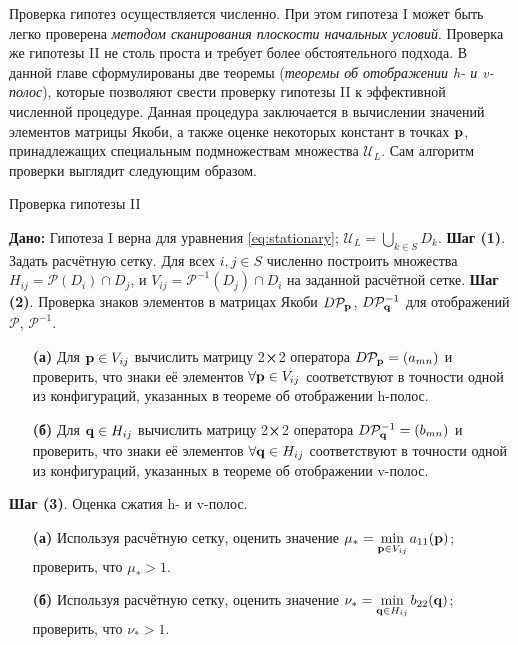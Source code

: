 \documentclass[candidate, href, colorlinks]{disser}
\begin{document}
Проверка гипотез осуществляется численно.
При этом гипотеза I может быть легко проверена {\it методом сканирования плоскости начальных условий}.
Проверка же гипотезы II не столь проста и требует более обстоятельного подхода.
В данной главе сформулированы две теоремы ({\it теоремы об отображении h- и v-полос}), которые позволяют свести проверку гипотезы II к эффективной численной процедуре.
Данная процедура заключается в вычислении значений элементов матрицы Якоби, а также оценке некоторых констант в точках $\vb{p}$, принадлежащих специальным подмножествам множества $\mathscr{U}_L$.
Сам алгоритм проверки выглядит следующим образом.

\begin{algorithm}[H]
\caption{Проверка гипотезы II}
\label{algorithm:hypotheses-validation}
\begin{algorithmic}
	\STATE \textbf{Дано:} Гипотеза I верна для уравнения \eqref{eq:stationary}; $\mathscr{U}_L = \bigcup_{k \in S} D_k$.
	\STATE \textbf{Шаг (1)}. Задать расчётную сетку.
		Для всех $i, j \in S$ численно построить множества $H_{ij} = \mathcal{P}(D_i) \cap D_j$, и $V_{ij} = \mathcal{P}^{-1} (D_j) \cap D_i$ на заданной расчётной сетке.
	\STATE \textbf{Шаг (2)}. Проверка знаков элементов в матрицах Якоби $D \mathcal{P}_{\vb{p}}$, $D \mathcal{P}_{\vb{q}}^{-1}$ для отображений $\mathcal{P}$, $\mathcal{P}^{-1}$.
	\STATE
	\begin{enumerate}
		\setlength{\itemsep}{1pt}
		\setlength{\parskip}{0pt}
  		\setlength{\parsep}{0pt}
		\item[\textbf{(а)}] Для $\vb{p} \in V_{ij}$ вычислить матрицу 2$\cross$2 оператора $D \mathcal{P}_{\vb{p}} = (a_{mn})$ и проверить, что знаки её элементов $\forall \vb{p} \in V_{ij}$ соответствуют в точности одной из конфигураций, указанных в теореме об отображении h-полос.
		\item[\textbf{(б)}] Для $\vb{q} \in H_{ij}$ вычислить матрицу 2$\cross$2 оператора $D \mathcal{P}_{\vb{q}}^{-1} = (b_{mn})$ и проверить, что знаки её элементов $\forall \vb{q} \in H_{ij}$ соответствуют в точности одной из конфигураций, указанных в теореме об отображении v-полос.
	\end{enumerate}
	\STATE \textbf{Шаг (3)}. Оценка сжатия h- и v-полос.
	\STATE
	\begin{enumerate}
		\setlength{\itemsep}{1pt}
		\setlength{\parskip}{0pt}
  		\setlength{\parsep}{0pt}
		\item[\textbf{(а)}] Используя расчётную сетку, оценить значение $\mu_* = \min \limits_{\vb{p} \in V_{ij}} a_{11}(\vb{p})$; проверить, что $\mu_* > 1$.
		\item[\textbf{(б)}] Используя расчётную сетку, оценить значение $\nu_* = \min \limits_{\vb{q} \in H_{ij}} b_{22}(\vb{q})$; проверить, что $\nu_* > 1$.
	\end{enumerate}
\end{algorithmic}
\end{algorithm}
\end{document}
